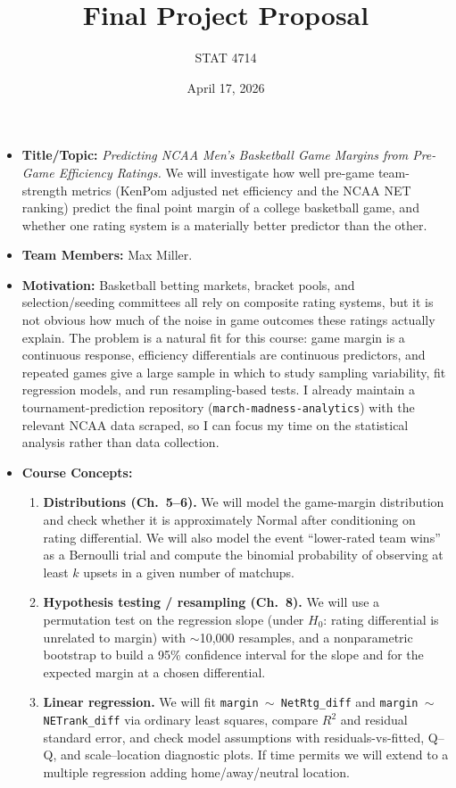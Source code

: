 \documentclass[11pt]{article}
\title{Final Project Proposal}
\author{STAT 4714}
\date{April 17, 2026}
\begin{document}
\maketitle

\begin{itemize}[leftmargin=*]
  \item \textbf{Title/Topic:} \emph{Predicting NCAA Men's Basketball Game Margins from Pre-Game Efficiency Ratings.} We will investigate how well pre-game team-strength metrics (KenPom adjusted net efficiency and the NCAA NET ranking) predict the final point margin of a college basketball game, and whether one rating system is a materially better predictor than the other.

  \item \textbf{Team Members:} Max Miller.

  \item \textbf{Motivation:} Basketball betting markets, bracket pools, and selection/seeding committees all rely on composite rating systems, but it is not obvious how much of the noise in game outcomes these ratings actually explain. The problem is a natural fit for this course: game margin is a continuous response, efficiency differentials are continuous predictors, and repeated games give a large sample in which to study sampling variability, fit regression models, and run resampling-based tests. I already maintain a tournament-prediction repository (\texttt{march-madness-analytics}) with the relevant NCAA data scraped, so I can focus my time on the statistical analysis rather than data collection.

  \item \textbf{Course Concepts:}
  \begin{enumerate}
    \item \textbf{Distributions (Ch.\ 5--6).} We will model the game-margin distribution and check whether it is approximately Normal after conditioning on rating differential. We will also model the event ``lower-rated team wins'' as a Bernoulli trial and compute the binomial probability of observing at least $k$ upsets in a given number of matchups.
    \item \textbf{Hypothesis testing / resampling (Ch.\ 8).} We will use a permutation test on the regression slope (under $H_0$: rating differential is unrelated to margin) with $\sim$10{,}000 resamples, and a nonparametric bootstrap to build a 95\% confidence interval for the slope and for the expected margin at a chosen differential.
    \item \textbf{Linear regression.} We will fit \texttt{margin $\sim$ NetRtg\_diff} and \texttt{margin $\sim$ NETrank\_diff} via ordinary least squares, compare $R^2$ and residual standard error, and check model assumptions with residuals-vs-fitted, Q--Q, and scale--location diagnostic plots. If time permits we will extend to a multiple regression adding home/away/neutral location.
  \end{enumerate}


\end{itemize}
\end{document}
